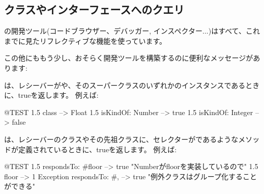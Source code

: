 \documentclass[a4paper,10pt,twoside]{book}
\begin{document}
\subsection{クラスやインターフェースへのクエリ}

\pharo{}の開発ツール(コードブラウザー、デバッガー, インスペクター...)はすべて、これまでに見たリフレクティブな機能を使っています。

この他にももう少し、おそらく開発ツールを構築するのに便利なメッセージがあります:

は、レシーバーがや、そのスーパークラスのいずれかのインスタンスであるときに、trueを返します。
例えば:
\begin{code}{@TEST}
1.5 class                     --> Float
1.5 isKindOf: Number --> true
1.5 isKindOf: Integer   --> false
\end{code}

は、レシーバーのクラスやその先祖クラスに、セレクターがであるようなメソッドが定義されているときに、trueを返します。%
例えば:
\begin{code}{@TEST}
1.5 respondsTo: #floor      --> true    "Numberがfloorを実装しているので"
1.5 floor                            --> 1
Exception respondsTo: #, --> true    "例外クラスはグループ化することができる"
\end{code}
\end{document}
